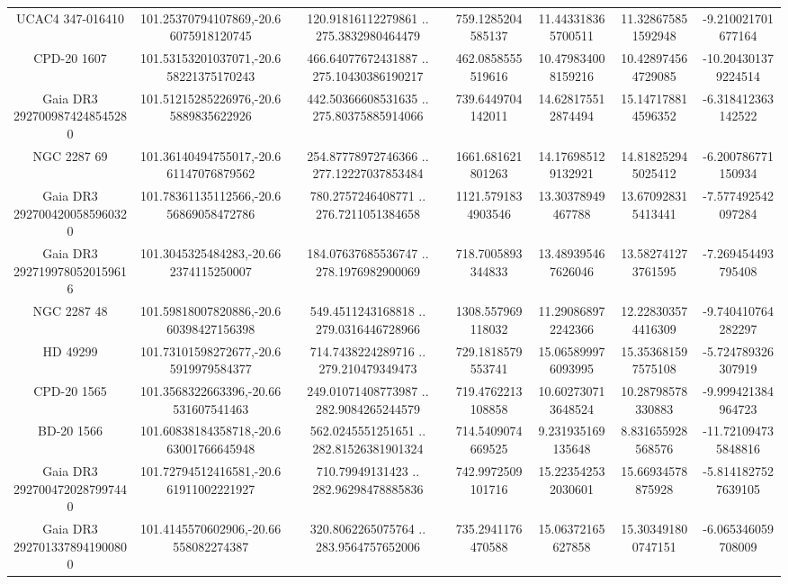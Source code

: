 \begin{table}
\begin{tabular}{ccccccc}
UCAC4 347-016410 & 101.25370794107869,-20.66075918120745 & 120.91816112279861 .. 275.3832980464479 & 759.1285204585137 & 11.443318365700511 & 11.328675851592948 & -9.210021701677164 \\
CPD-20  1607 & 101.53153201037071,-20.658221375170243 & 466.64077672431887 .. 275.10430386190217 & 462.0858555519616 & 10.479834008159216 & 10.428974564729085 & -10.204301379224514 \\
Gaia DR3 2927009874248545280 & 101.51215285226976,-20.65889835622926 & 442.50366608531635 .. 275.80375885914066 & 739.6449704142011 & 14.628175512874494 & 15.147178814596352 & -6.318412363142522 \\
NGC  2287    69 & 101.36140494755017,-20.661147076879562 & 254.87778972746366 .. 277.12227037853484 & 1661.681621801263 & 14.176985129132921 & 14.818252945025412 & -6.200786771150934 \\
Gaia DR3 2927004200585960320 & 101.78361135112566,-20.656869058472786 & 780.2757246408771 .. 276.7211051384658 & 1121.5791834903546 & 13.30378949467788 & 13.670928315413441 & -7.577492542097284 \\
Gaia DR3 2927199780520159616 & 101.3045325484283,-20.662374115250007 & 184.07637685536747 .. 278.1976982900069 & 718.7005893344833 & 13.489395467626046 & 13.582741273761595 & -7.269454493795408 \\
NGC  2287    48 & 101.59818007820886,-20.660398427156398 & 549.4511243168818 .. 279.0316446728966 & 1308.557969118032 & 11.290868972242366 & 12.228303574416309 & -9.740410764282297 \\
HD  49299 & 101.73101598272677,-20.65919979584377 & 714.7438224289716 .. 279.210479349473 & 729.1818579553741 & 15.065899976093995 & 15.353681597575108 & -5.724789326307919 \\
CPD-20  1565 & 101.3568322663396,-20.66531607541463 & 249.01071408773987 .. 282.9084265244579 & 719.4762213108858 & 10.602730713648524 & 10.28798578330883 & -9.999421384964723 \\
BD-20  1566 & 101.60838184358718,-20.663001766645948 & 562.0245551251651 .. 282.81526381901324 & 714.5409074669525 & 9.231935169135648 & 8.831655928568576 & -11.721094735848816 \\
Gaia DR3 2927004720287997440 & 101.72794512416581,-20.661911002221927 & 710.79949131423 .. 282.96298478885836 & 742.9972509101716 & 15.223542532030601 & 15.66934578875928 & -5.8141827527639105 \\
Gaia DR3 2927013378941900800 & 101.4145570602906,-20.66558082274387 & 320.8062265075764 .. 283.9564757652006 & 735.2941176470588 & 15.06372165627858 & 15.303491800747151 & -6.065346059708009 \\

\end{tabular}
\end{table}

